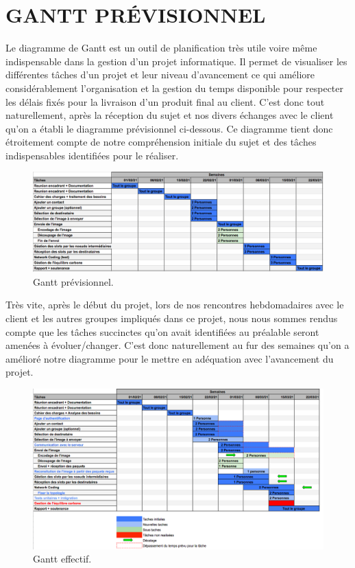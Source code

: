 \chapter{ GANTT PRÉVISIONNEL}

Le diagramme de Gantt est un outil de planification très utile voire même indispensable dans la gestion d'un projet informatique. Il permet de visualiser les différentes tâches d'un projet et leur niveau d'avancement ce qui améliore considérablement l'organisation et la gestion du temps disponible pour respecter les délais fixés pour la livraison d'un produit final au client. C'est donc tout naturellement, après la réception du sujet et nos divers échanges avec le client qu'on a établi le diagramme prévisionnel ci-dessous. Ce diagramme tient donc étroitement compte de notre compréhension initiale du sujet et des tâches indispensables identifiées pour le réaliser. 

\begin{figure}[H]
    \includegraphics[width=18cm]{images/gantt.png}
    \caption{Gantt prévisionnel.}
\end{figure}

Très vite, après le début du projet, lors de nos rencontres hebdomadaires avec le client et les autres groupes impliqués dans ce projet, nous nous sommes rendus compte que les tâches succinctes qu'on avait identifiées au préalable seront amenées à évoluer/changer. C'est donc naturellement au fur des semaines qu'on a amélioré notre diagramme pour le mettre en adéquation avec l'avancement du projet. 

\begin{figure}[H]
    \includegraphics[width=18.5cm]{images/gantbis.png}
    \caption{Gantt effectif.}
\end{figure}


